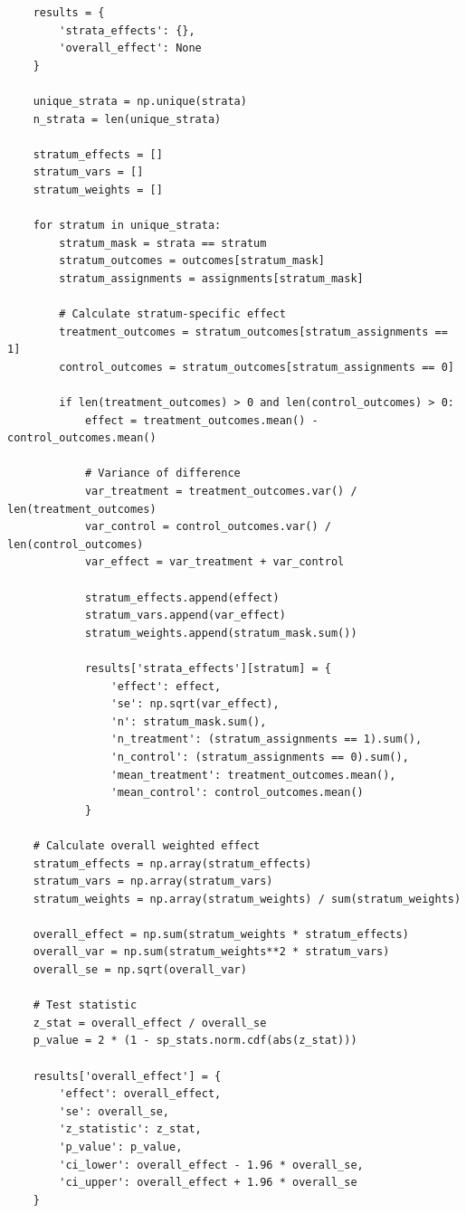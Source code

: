 \begin{lstlisting}
    results = {
        'strata_effects': {},
        'overall_effect': None
    }

    unique_strata = np.unique(strata)
    n_strata = len(unique_strata)

    stratum_effects = []
    stratum_vars = []
    stratum_weights = []

    for stratum in unique_strata:
        stratum_mask = strata == stratum
        stratum_outcomes = outcomes[stratum_mask]
        stratum_assignments = assignments[stratum_mask]

        # Calculate stratum-specific effect
        treatment_outcomes = stratum_outcomes[stratum_assignments == 1]
        control_outcomes = stratum_outcomes[stratum_assignments == 0]

        if len(treatment_outcomes) > 0 and len(control_outcomes) > 0:
            effect = treatment_outcomes.mean() - control_outcomes.mean()

            # Variance of difference
            var_treatment = treatment_outcomes.var() / len(treatment_outcomes)
            var_control = control_outcomes.var() / len(control_outcomes)
            var_effect = var_treatment + var_control

            stratum_effects.append(effect)
            stratum_vars.append(var_effect)
            stratum_weights.append(stratum_mask.sum())

            results['strata_effects'][stratum] = {
                'effect': effect,
                'se': np.sqrt(var_effect),
                'n': stratum_mask.sum(),
                'n_treatment': (stratum_assignments == 1).sum(),
                'n_control': (stratum_assignments == 0).sum(),
                'mean_treatment': treatment_outcomes.mean(),
                'mean_control': control_outcomes.mean()
            }

    # Calculate overall weighted effect
    stratum_effects = np.array(stratum_effects)
    stratum_vars = np.array(stratum_vars)
    stratum_weights = np.array(stratum_weights) / sum(stratum_weights)

    overall_effect = np.sum(stratum_weights * stratum_effects)
    overall_var = np.sum(stratum_weights**2 * stratum_vars)
    overall_se = np.sqrt(overall_var)

    # Test statistic
    z_stat = overall_effect / overall_se
    p_value = 2 * (1 - sp_stats.norm.cdf(abs(z_stat)))

    results['overall_effect'] = {
        'effect': overall_effect,
        'se': overall_se,
        'z_statistic': z_stat,
        'p_value': p_value,
        'ci_lower': overall_effect - 1.96 * overall_se,
        'ci_upper': overall_effect + 1.96 * overall_se
    }


\end{lstlisting}
